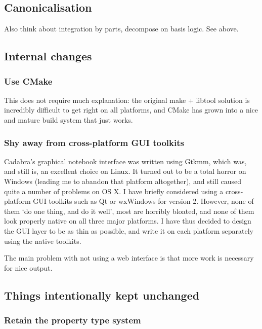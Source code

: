 \documentclass[11pt]{article}
\begin{document}
\subsection{Canonicalisation}

Also think about integration by parts, decompose on basis logic. See above.


\subsection{Internal changes}
\subsubsection{Use CMake}

This does not require much explanation: the original make + libtool
solution is incredibly difficult to get right on all platforms, and
CMake has grown into a nice and mature build system that just works.

\subsubsection{Shy away from cross-platform GUI toolkits}

Cadabra's graphical notebook interface was written using Gtkmm, which
was, and still is, an excellent choice on Linux. It turned out to be a
total horror on Windows (leading me to abandon that platform
altogether), and still caused quite a number of problems on OS X.  I
have briefly considered using a cross-platform GUI toolkits such as Qt
or wxWindows for version 2. However, none of them `do one thing, and
do it well', most are horribly bloated, and none of them look properly
native on all three major platforms. I have thus decided to design the
GUI layer to be as thin as possible, and write it on each platform
separately using the native toolkits.

The main problem with not using a web interface is that more work is
necessary for nice output. 

\subsection{Things intentionally kept unchanged}
\subsubsection{Retain the property type system}
\end{document}
